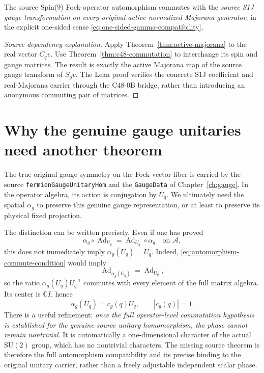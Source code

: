 \begin{theorem}
\label{thm:c48-active-compat}
The source Spin(9) Fock-operator automorphism commutes with the
\emph{source S1J gauge transformation on every original active
normalized Majorana generator}, in the explicit one-sided sense
\eqref{eq:one-sided-gamma-compatibility}.
\end{theorem}
\begin{proof}[Source dependency explanation]
Apply Theorem~\ref{thm:active-majorana} to the real vector $C_qv$.
Use Theorem~\ref{thm:c48-commutation} to interchange its spin and
gauge matrices. The result is exactly the active Majorana map of the
source gauge transform of $S_gv$. The Lean proof verifies the concrete
S1J coefficient and real-Majorana carrier through the C48-0B bridge,
rather than introducing an anonymous commuting pair of matrices.
\end{proof}

\section{Why the genuine gauge unitaries need another theorem}
The true original gauge symmetry on the Fock-vector fiber is carried
by the source \texttt{fermionGaugeUnitaryHom} and the
\texttt{GaugeData} of Chapter~\ref{ch:gauge}. In the operator algebra,
its action is conjugation by $U_q$. We ultimately need the spatial
$\alpha_g$ to preserve this genuine gauge representation, or at least
to preserve its physical fixed projection.

The distinction can be written precisely. Even if one has proved
\begin{equation}\label{eq:automorphism-commute-condition}
 \alpha_g\circ\operatorname{Ad}_{U_q}
   =\operatorname{Ad}_{U_q}\circ\alpha_g
 \quad\text{on }\mathscr A,
\end{equation}
this does not immediately imply $\alpha_g(U_q)=U_q$. Indeed,
\eqref{eq:automorphism-commute-condition} would imply
\[
 \operatorname{Ad}_{\alpha_g(U_q)}
       =\operatorname{Ad}_{U_q},
\]
so the ratio $\alpha_g(U_q)U_q^{-1}$ commutes with every element of
the full matrix algebra. Its center is $\mathbb C I$, hence
\begin{equation}\label{eq:phase-ambiguity}
 \alpha_g(U_q)=c_g(q)U_q,\qquad |c_g(q)|=1.
\end{equation}
There is a useful refinement: \emph{once the full operator-level
commutation hypothesis is established for the genuine source
unitary homomorphism, the phase cannot remain nontrivial}. It is
automatically a one-dimensional character of the actual
$\mathrm{SU}(2)$ group, which has no nontrivial characters.
The missing source theorem is therefore the full automorphism
compatibility and its precise binding to the original unitary
carrier, rather than a freely adjustable independent scalar phase.


